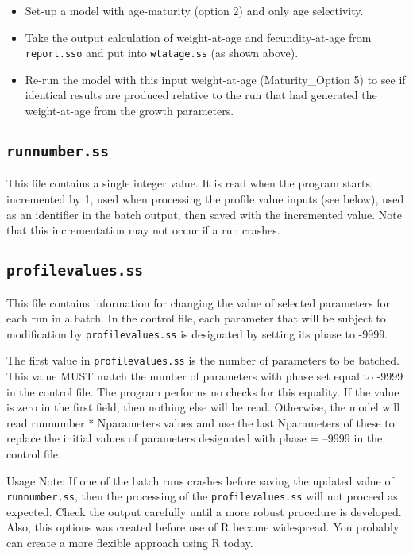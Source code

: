 		\begin{itemize}
			\item Set-up a model with age-maturity (option 2) and only age selectivity.
			\item Take the output calculation of weight-at-age and fecundity-at-age  from \verb|report.sso| and put into \verb|wtatage.ss| (as shown above).
			\item Re-run the model with this input weight-at-age (Maturity\_Option 5) to see if identical results are produced relative to the run that had generated the weight-at-age from the growth parameters.
		\end{itemize}


\subsection{\texttt{runnumber.ss}}
This file contains a single integer value. It is read when the program starts, incremented by 1, used when processing the profile value inputs (see below), used as an identifier in the batch output, then saved with the incremented value. Note that this incrementation may not occur if a run crashes.

\subsection{\texttt{profilevalues.ss}}	
This file contains information for changing the value of selected parameters for each run in a batch. In the control file, each parameter that will be subject to modification by \verb|profilevalues.ss| is designated by setting its phase to -9999.

The first value in \verb|profilevalues.ss| is the number of parameters to be batched. This value MUST match the number of parameters with phase set equal to -9999 in the control file. The program performs no checks for this equality. If the value is zero in the first field, then nothing else will be read. Otherwise, the model will read runnumber * Nparameters values and use the last Nparameters of these to replace the initial values of parameters designated with phase = --9999 in the control file.

Usage Note: If one of the batch runs crashes before saving the updated value of \verb|runnumber.ss|, then the processing of the \verb|profilevalues.ss| will not proceed as expected. Check the output carefully until a more robust procedure is developed. Also, this options was created before use of R became widespread. You probably can create a more flexible approach using R today.


\pagebreak